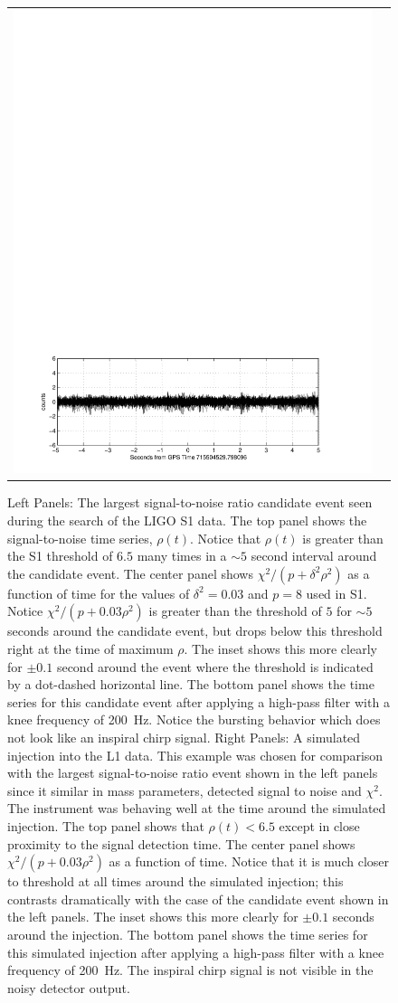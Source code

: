 \begin{figure}[p]
\begin{center}
\begin{tabular}{cc}
\includegraphics[width=0.475\linewidth]{figures/pipeline/injection-ts}
\end{tabular}
\end{center}
\caption[Largest Inspiral Trigger Seen in the S1 Analysis]{
\label{f:s1loudest}
Left Panels: The largest signal-to-noise ratio candidate event seen during the
search of the LIGO S1 data. The top panel shows the signal-to-noise time
series, $\rho(t)$.  Notice that $\rho(t)$ is greater than the S1 threshold of
$6.5$ many times in a  $\sim 5$ second interval around the candidate event.
The center panel shows $\chi^2/ (p+ \delta^2 \rho^2)$ as a function of time
for the values of $\delta^2 = 0.03$ and $p = 8$ used in S1.  Notice $\chi^2 /
(p+ 0.03 \rho^2)$ is greater than the threshold of $5$ for $\sim 5$ seconds
around the candidate event,  but drops below this threshold right at the time
of maximum $\rho$.  The inset shows this more clearly for $\pm 0.1$ second
around the event where the threshold is indicated by a dot-dashed horizontal
line.  The bottom panel shows the time series for this candidate event after
applying a high-pass filter with a knee frequency of 200~Hz.  Notice the
bursting behavior which does not look like an inspiral chirp signal.  \break
Right Panels: A simulated injection into the L1 data.  This example was chosen
for comparison with the largest signal-to-noise ratio event shown in the left
panels since it similar in mass parameters, detected signal to noise and
$\chi^2$.   The instrument was behaving well at the time around the simulated
injection.  The top panel shows that $\rho(t) < 6.5$ except in close proximity
to the signal detection time.  The center panel shows $\chi^2/ (p+ 0.03
\rho^2)$ as a function of time.  Notice that it is much closer to threshold at
all times around the simulated injection; this contrasts dramatically with the
case of the candidate event shown in the left panels.  The inset shows this
more clearly for $\pm 0.1$ seconds around the injection.  The bottom panel
shows the time series for this simulated injection after applying a high-pass
filter with a knee frequency of 200~Hz.  The inspiral chirp signal is not
visible in the noisy detector output.
}
\end{figure}

